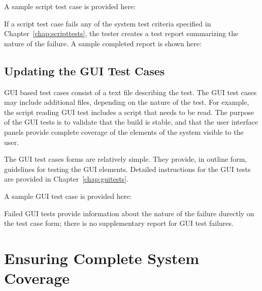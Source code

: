 \noindent A sample script test case is provided here:

\begin{quote}
\end{quote}

If a script test case fails any of the system test criteria specified in
Chapter~\ref{chap:scripttests}, the tester creates a test report summarizing the nature of the
failure.  A sample completed report is shown here:

\begin{quote}
\end{quote}

\subsection{Updating the GUI Test Cases}

GUI based test cases consist of a text file describing the test.  The GUI test cases may include
additional files, depending on the nature of the test.  For example, the script reading GUI test
includes a script that needs to be read.  The purpose of the GUI tests is to validate that the
build is stable, and that the user interface panels provide complete coverage of the elements of
the system visible to the user.

The GUI test cases forms are relatively simple.  They provide, in outline form, guidelines for
testing the GUI elements.  Detailed instructions for the GUI tests are provided in
Chapter~\ref{chap:guitests}.

A sample GUI test case is provided here:

\begin{quote}
\end{quote}

Failed GUI tests provide information about the nature of the failure durectly on the test case
form; there is no supplementary report for GUI test failures.

\section{\label{section:CompleteCoverage}Ensuring Complete System Coverage}

